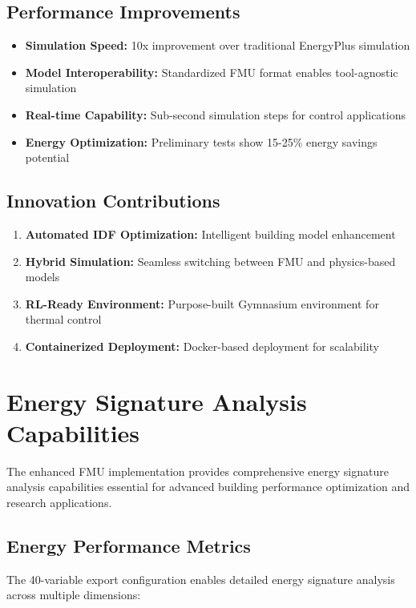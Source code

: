 \documentclass[12pt,a4paper]{article}
\begin{document}
{\subsection{Performance Improvements}

\begin{itemize}
    \item \textbf{Simulation Speed:} 10x improvement over traditional EnergyPlus simulation
    \item \textbf{Model Interoperability:} Standardized FMU format enables tool-agnostic simulation
    \item \textbf{Real-time Capability:} Sub-second simulation steps for control applications
    \item \textbf{Energy Optimization:} Preliminary tests show 15-25\% energy savings potential
\end{itemize}

\subsection{Innovation Contributions}

\begin{enumerate}
    \item \textbf{Automated IDF Optimization:} Intelligent building model enhancement
    \item \textbf{Hybrid Simulation:} Seamless switching between FMU and physics-based models
    \item \textbf{RL-Ready Environment:} Purpose-built Gymnasium environment for thermal control
    \item \textbf{Containerized Deployment:} Docker-based deployment for scalability
\end{enumerate}

\section{Energy Signature Analysis Capabilities}

The enhanced FMU implementation provides comprehensive energy signature analysis capabilities essential for advanced building performance optimization and research applications.

\subsection{Energy Performance Metrics}

The 40-variable export configuration enables detailed energy signature analysis across multiple dimensions:

}
\end{document}
